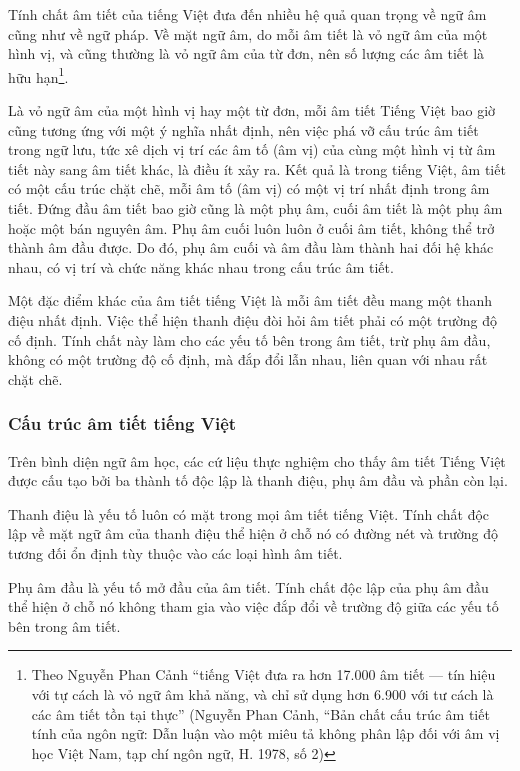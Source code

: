 \documentclass[a4paper,oneside,14pt]{extbook} %
\begin{document}
Tính chất âm tiết của tiếng Việt đưa đến nhiều hệ quả quan trọng về
ngữ âm cũng như về ngữ pháp. Về mặt ngữ âm, do mỗi âm tiết là vỏ ngữ
âm của một hình vị, và cũng thường là vỏ ngữ âm của từ đơn, nên số
lượng các âm tiết là hữu hạn\footnote{Theo Nguyễn Phan Cảnh ``tiếng
  Việt đưa ra hơn 17.000 âm tiết --- tín hiệu với tự cách là vỏ ngữ âm
khả năng, và chỉ sử dụng hơn 6.900 với tư cách là các âm tiết tồn tại
thực'' (Nguyễn Phan Cảnh, ``Bản chất cấu trúc âm tiết tính của ngôn
ngữ: Dẫn luận vào một miêu tả không phân lập đối với âm vị học Việt
Nam, tạp chí ngôn ngữ, H. 1978, số 2)}.

Là vỏ ngữ âm của một hình vị hay một từ đơn, mỗi âm tiết Tiếng Việt
bao giờ cũng tương ứng với một ý nghĩa nhất định, nên việc phá vỡ cấu
trúc âm tiết trong ngữ lưu, tức xê dịch vị trí các âm tố (âm vị) của
cùng một hình vị từ âm tiết này sang âm tiết khác, là điều ít xảy
ra. Kết quả là trong tiếng Việt, âm tiết có một cấu trúc chặt chẽ, mỗi
âm tố (âm vị) có một vị trí nhất định trong âm tiết. Đứng đầu âm tiết
bao giờ cũng là một phụ âm, cuối âm tiết là một phụ âm hoặc một bán
nguyên âm. Phụ âm cuối luôn luôn ở cuối âm tiết, không thể trở thành
âm đầu được. Do đó, phụ âm cuối và âm đầu làm thành hai đối hệ khác
nhau, có vị trí và chức năng khác nhau trong cấu trúc âm tiết.

Một đặc điểm khác của âm tiết tiếng Việt là mỗi âm tiết đều mang
một thanh điệu nhất định. Việc thể hiện thanh điệu đòi hỏi âm tiết
phải có một trường độ cố định. Tính chất này làm cho các yếu tố bên
trong âm tiết, trừ phụ âm đầu, không có một trường độ cố định, mà đắp
đổi lẫn nhau, liên quan với nhau rất chặt chẽ.


\subsubsection{Cấu trúc âm tiết tiếng Việt}

Trên bình diện ngữ âm học, các cứ liệu thực nghiệm cho thấy âm tiết
Tiếng Việt được cấu tạo bởi ba thành tố độc lập là thanh điệu, phụ âm
đầu và phần còn lại.

Thanh điệu là yếu tố luôn có mặt trong mọi âm tiết tiếng Việt. Tính
chất độc lập về mặt ngữ âm của thanh điệu thể hiện ở chỗ nó có đường
nét và trường độ tương đối ổn định tùy thuộc vào các loại hình âm
tiết.

Phụ âm đầu là yếu tố mở đầu của âm tiết. Tính chất độc lập của phụ âm
đầu thể hiện ở chỗ nó không tham gia vào việc đắp đổi về trường độ
giữa các yếu tố bên trong âm tiết.
\end{document}
